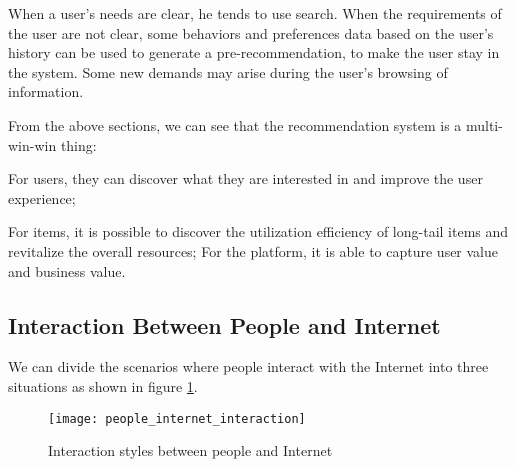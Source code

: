 \par When a user's needs are clear, he tends to use search. When the requirements of the user are not clear, some behaviors and preferences data based on the user's history can be used to generate a pre-recommendation, to make the user stay in the system. Some new demands may arise during the user's browsing of information.
\par From the above sections, we can see that the recommendation system is a multi-win-win thing:
\par For users, they can discover what they are interested in and improve the user experience;
\par For items, it is possible to discover the utilization efficiency of long-tail items and revitalize the overall resources;
For the platform, it is able to capture user value and business value.

\subsection{Interaction Between People and Internet}
We can divide the scenarios where people interact with the Internet into three situations as shown in figure \ref{figure:1-1}.

\begin{figure}[h]
\caption{Interaction styles between people and Internet}
\label{figure:1-1}
\centering
\texttt{[image: people\_internet\_interaction]}
\end{figure}

